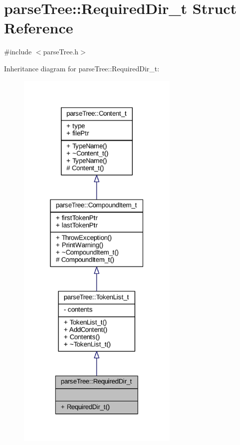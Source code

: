 \hypertarget{structparse_tree_1_1_required_dir__t}{}\section{parse\+Tree\+:\+:Required\+Dir\+\_\+t Struct Reference}
\label{structparse_tree_1_1_required_dir__t}


{\ttfamily \#include $<$parse\+Tree.\+h$>$}



Inheritance diagram for parse\+Tree\+:\+:Required\+Dir\+\_\+t\+:
\nopagebreak
\begin{figure}[H]
\begin{center}
\leavevmode
\includegraphics[width=219pt]{structparse_tree_1_1_required_dir__t__inherit__graph}
\end{center}
\end{figure}


